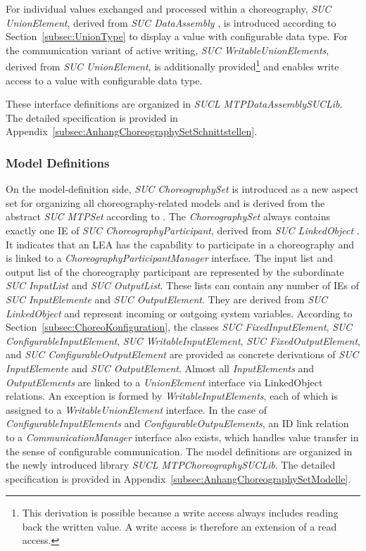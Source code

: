 For individual values exchanged and processed within a choreography, \emph{SUC UnionElement}, derived from \emph{SUC DataAssembly} \cite{PNO.2025.Part1}, is introduced according to Section~\ref{subsec:UnionType} to display a value with configurable data type. For the communication variant of active writing, \emph{SUC WritableUnionElements}, derived from \emph{SUC UnionElement}, is additionally provided\footnote{This derivation is possible because a write access always includes reading back the written value. A write access is therefore an extension of a read access. } and enables write access to a value with configurable data type. 

These interface definitions are organized in \emph{SUCL MTPDataAssemblySUCLib}. The detailed specification is provided in Appendix~\ref{subsec:AnhangChoreographySetSchnittstellen}. 

\subsubsection{Model Definitions}

On the model-definition side, \emph{SUC ChoreographySet} is introduced as a new aspect set for organizing all choreography-related models and is derived from the abstract \emph{SUC MTPSet} according to \cite{PNO.2025.Part1}. The \emph{ChoreographySet} always contains exactly one IE of \emph{SUC ChoreographyParticipant}, derived from \emph{SUC LinkedObject} \cite{PNO.2025.Part1}. It indicates that an LEA has the capability to participate in a choreography and is linked to a \emph{ChoreographyParticipantManager} interface. The input list and output list of the choreography participant are represented by the subordinate \emph{SUC InputList} and \emph{SUC OutputList}. These lists can contain any number of IEs of \emph{SUC InputElemente} and \emph{SUC OutputElement}. They are derived from \emph{SUC LinkedObject} and represent incoming or outgoing system variables. According to Section~\ref{subsec:ChoreoKonfiguration}, the classes \emph{SUC FixedInputElement}, \emph{SUC ConfigurableInputElement}, \emph{SUC WritableInputElement}, \emph{SUC FixedOutputElement}, and \emph{SUC ConfigurableOutputElement} are provided as concrete derivations of \emph{SUC InputElemente} and \emph{SUC OutputElement}. Almost all \emph{InputElements} and \emph{OutputElements} are linked to a \emph{UnionElement} interface via LinkedObject relations. An exception is formed by \emph{WritableInputElements}, each of which is assigned to a \emph{WritableUnionElement} interface. In the case of \emph{ConfigurableInputElements} and \emph{ConfigurableOutpuElements}, an ID link relation to a \emph{CommunicationManager} interface also exists, which handles value transfer in the sense of configurable communication. The model definitions are organized in the newly introduced library \emph{SUCL MTPChoreographySUCLib}. The detailed specification is provided in Appendix~\ref{subsec:AnhangChoreographySetModelle}.

